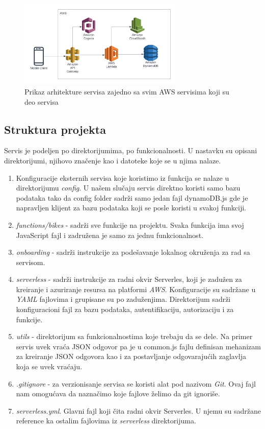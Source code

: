 \documentclass[12pt,oneside]{memoir}
\begin{document}
\begin{figure}[!ht]
  \centering
  \includegraphics[width=0.7\textwidth]{AWS-Architecture-Overview.PNG}
  \caption{Prikaz arhitekture servisa zajedno sa svim AWS servisima koji su deo servisa}
  \label{fig:awsArchitecture}
\end{figure}


\subsection{Struktura projekta}
Servis je podeljen po direktorijumima, po funkcionalnosti. U nastavku su opisani direktorijumi, njihovo značenje kao i datoteke koje se u njima nalaze.

\begin{enumerate}
  \item Konfiguracije eksternih servisa koje koristimo iz funkcija se nalaze u direktorijumu \emph{config}. U našem slučaju servis direktno koristi samo bazu podataka tako da config folder sadrži samo jedan fajl dynamoDB.js gde je napravljen klijent za bazu podataka koji se posle koristi u svakoj funkciji.
  \item \emph{functions/bikes} - sadrži sve funkcije na projektu. Svaka funkcija ima svoj JavaScript fajl i zadružena je samo za jednu funkcionalnost. 
  \item \emph{onboarding} - sadrži instrukcije za podešavanje lokalnog okruženja za rad sa servisom.
  \item \emph{serverless} - sadrži instrukcije za radni okvir Serverles, koji je zadužen za kreiranje i azuriranje resursa na platformi \emph{AWS}. Konfiguracije su sadržane u \emph{YAML} fajlovima i grupisane su po zaduženjima. Direktorijum sadrži konfiguracioni fajl za bazu podataka, autentifikaciju, autorizaciju i za funkcije.
  \item \emph{utils} - direktorijum sa funkcionalnostima koje trebaju da se dele. Na primer servis uvek vraća JSON odgovor pa je u common.js fajlu definisan mehanizam za kreiranje JSON odgovora kao i za postavljanje odgovarajućih zaglavlja koja se uvek vraćaju.
  \item \emph{.gitignore} - za verzionisanje servisa se koristi alat pod nazivom \emph{Git}. Ovaj fajl nam omogućava da naznačimo koje fajlove želimo da git ignoriše.
  \item \emph{serverless.yml}. Glavni fajl koji čita radni okvir Serverles. U njemu su sadržane reference ka ostalim fajlovima iz \emph{serverless} direktorijuma.
\end{enumerate}
\end{document}
